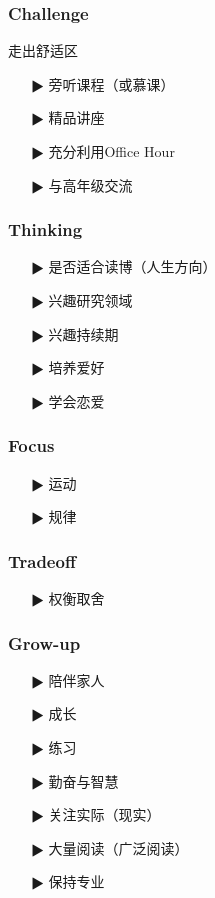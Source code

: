 \documentclass[11pt,mathserif]{beamer} %
\begin{document}
\begin{frame}
  \frametitle{Challenge}
  走出舒适区
  \begin{itemize}
    \item[$\RHD$] 旁听课程（或慕课）
    \item[$\RHD$] 精品讲座
    \item[$\RHD$] 充分利用Office Hour
    \item[$\RHD$] 与高年级交流    
  \end{itemize}
\end{frame}

\begin{frame}
  \frametitle{Thinking}
  \begin{itemize}
    \item[$\RHD$] 是否适合读博（人生方向）
    \item[$\RHD$] 兴趣研究领域
    \item[$\RHD$] 兴趣持续期
    \item[$\RHD$] 培养爱好
    \item[$\RHD$] 学会恋爱 
  \end{itemize}
\end{frame}

\begin{frame}
  \frametitle{Focus}
  \begin{itemize}
    \item[$\RHD$] 运动
    \item[$\RHD$] 规律
  \end{itemize}
\end{frame}

\begin{frame}
  \frametitle{Tradeoff}
  \begin{itemize}
    \item[$\RHD$] 权衡取舍
  \end{itemize}
\end{frame}

\begin{frame}
  \frametitle{Grow-up}
  \begin{itemize}
    \item[$\RHD$] 陪伴家人
    \item[$\RHD$] 成长
    \item[$\RHD$] 练习
    \item[$\RHD$] 勤奋与智慧
    \item[$\RHD$] 关注实际（现实）
    \item[$\RHD$] 大量阅读（广泛阅读）
    \item[$\RHD$] 保持专业
  \end{itemize}
\end{frame}
\end{document}
